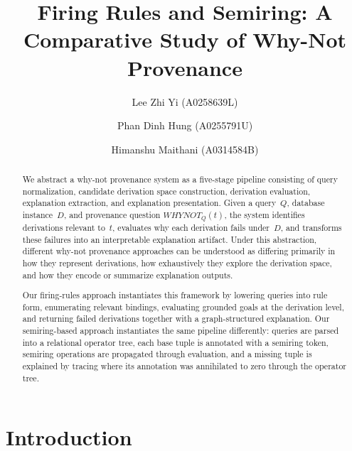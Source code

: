 \documentclass{llncs}
\begin{document}
\title{Firing Rules and Semiring: A Comparative Study of Why-Not Provenance}

\author{
  Lee Zhi Yi (A0258639L) \and
  Phan Dinh Hung (A0255791U) \and
  Himanshu Maithani (A0314584B)
}


\maketitle

\begin{abstract}
We abstract a why-not provenance system as a five-stage pipeline
consisting of query normalization, candidate derivation space
construction, derivation evaluation, explanation extraction, and
explanation presentation. Given a query~$Q$, database instance~$D$,
and provenance question $\mathit{WHYNOT}_Q(t)$, the system identifies
derivations relevant to~$t$, evaluates why each derivation fails
under~$D$, and transforms these failures into an interpretable
explanation artifact. Under this abstraction, different why-not
provenance approaches can be understood as differing primarily in how
they represent derivations, how exhaustively they explore the
derivation space, and how they encode or summarize explanation outputs.

Our firing-rules approach instantiates this framework by lowering
queries into rule form, enumerating relevant bindings, evaluating
grounded goals at the derivation level, and returning failed
derivations together with a graph-structured explanation. Our
semiring-based approach instantiates the same pipeline differently:
queries are parsed into a relational operator tree, each base tuple
is annotated with a semiring token, semiring operations are propagated
through evaluation, and a missing tuple is explained by tracing where
its annotation was annihilated to zero through the operator tree.

\end{abstract}

\section{Introduction}
\label{sec:intro}
\end{document}
